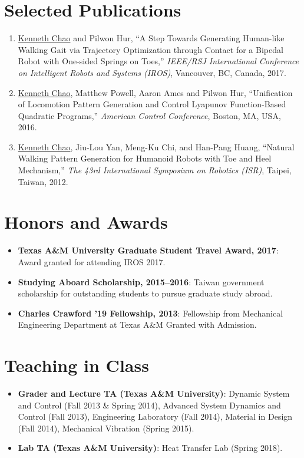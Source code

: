 \documentclass[letterpaper,11pt]{article}
\newcommand{\resumeItem}[2]{
  \item\small{
    \textbf{#1}{: #2 \vspace{-2pt}}
  }
}
\newcommand{\resumeNumItem}[1]{
  \item\small{
    {#1 \vspace{-2pt}}
  }
}
\newcommand{\resumeSubItem}[2]{\resumeItem{#1}{#2}\vspace{-4pt}}
\newcommand{\resumeSubHeadingListStart}{\begin{itemize}[leftmargin=*]}
\newcommand{\resumeSubHeadingListEnd}{\end{itemize}}
\newcommand{\resumeNumItemListStart}{\begin{enumerate}}
\newcommand{\resumeNumItemListEnd}{\end{enumerate}\vspace{-5pt}}
\begin{document}
\section{Selected Publications}
  \resumeNumItemListStart
\resumeNumItem
{\underline{Kenneth Chao} and Pilwon Hur, ``A Step Towards Generating Human-like Walking Gait via Trajectory Optimization through Contact for a Bipedal Robot with One-sided Springs on Toes,''  \textit{IEEE/RSJ International Conference on Intelligent Robots and Systems (IROS)}, Vancouver, BC, Canada, 2017.}  
  
\resumeNumItem
{\underline{Kenneth Chao}, Matthew Powell, Aaron Ames and Pilwon Hur, ``Unification of Locomotion Pattern Generation and Control Lyapunov Function-Based Quadratic Programs,''
             	\textit{American Control Conference},
             	Boston, MA, USA, 2016.}
\resumeNumItem
{\underline{Kenneth Chao}, Jiu-Lou Yan, Meng-Ku Chi, and Han-Pang Huang,
	``Natural Walking Pattern Generation for Humanoid Robots with Toe and Heel Mechanism,''
	\textit{The 43rd International Symposium on Robotics (ISR)},
	Taipei, Taiwan,
2012.}
%    	
  \resumeNumItemListEnd


\section{Honors and Awards}
  \resumeSubHeadingListStart
        \resumeSubItem{Texas A\&M University Graduate Student Travel Award, 2017}
        {Award granted for attending IROS 2017.}     
      \resumeSubItem{Studying Aboard Scholarship, 2015--2016}
      {Taiwan government scholarship for outstanding students to pursue graduate study abroad.}
      \resumeSubItem{Charles Crawford '19 Fellowship, 2013}
      {Fellowship from Mechanical Engineering Department at Texas A\&M Granted with Admission.}
  \resumeSubHeadingListEnd
\section{Teaching in Class}
  \resumeSubHeadingListStart
      \resumeSubItem{Grader and Lecture TA (Texas A\&M University)}
      {Dynamic System and Control (Fall 2013 \& Spring 2014), Advanced System Dynamics and Control (Fall 2013), Engineering Laboratory (Fall 2014), Material in Design (Fall 2014), Mechanical Vibration (Spring 2015).}
      \resumeSubItem{Lab TA (Texas A\&M University)}
      {Heat Transfer Lab (Spring 2018).}      
  \resumeSubHeadingListEnd
\end{document}

